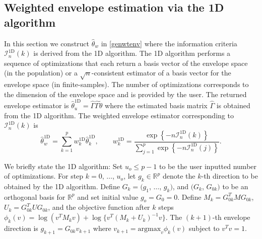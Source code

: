\documentclass{article}\usepackage[]{graphicx}\usepackage[]{color}
\newcommand{\R}{\mathbb{R}}
\newcommand{\TD}{\widehat{\theta}^{\text{1D}}}
\newcommand{\Ttil}{\widetilde{\theta}}
\newcommand{\rootn}{\sqrt{n}}
\newcommand{\EnvwoneD}{\widehat{\theta}^{\text{1D}}_w}
\newcommand{\IoneD}{\mathcal{I}_n^{\text{1D}}}
\newcommand{\woneD}{w^{\text{1D}}}
\begin{document}
\subsection{Weighted envelope estimation via the 1D algorithm}
\label{section:1D}

In this section we construct $\hat{\theta}_w$ in \eqref{genwtenv} where the information criteria $\IoneD(k)$ is derived from the 1D algorithm. The 1D algorithm performs a sequence of optimizations that each return a basis vector of the envelope space (in the population) or a $\rootn$-consistent estimator of a basis vector for the envelope space (in finite-samples). The number of optimizations corresponds to the dimension of the envelope space and is provided by the user. The returned envelope estimator is $\TD_u = \widehat{\Gamma}\widehat{\Gamma}\Ttil$ where the estimated basis matrix $\widehat{\Gamma}$ is obtained from the 1D algorithm. The weighted envelope estimator corresponding to $\IoneD(k)$ is 
\begin{equation} \label{env1D}
  \EnvwoneD = \sum_{k=1}^p \woneD_k\TD_k, 
    \qquad \woneD_k = \frac
  {
    \exp\left\{-n\IoneD(k)\right\}
  }
  {
    \sum_{j=1}^p\exp\left\{-n\IoneD(j)\right\}
  }.
\end{equation}

We briefly state the 1D algorithm: Set $u_o \leq p-1$ to be the user inputted number of optimizations. For step $k = 0$, $\ldots$, $u_o$, let $g_k \in \R^p$ denote the $k$-th direction to be obtained by the 1D algorithm. Define $G_k = (g_1$, $\ldots$, $g_k)$, and $(G_k$, $G_{0k})$ to be an orthogonal basis for $\R^p$ and set initial value $g_o = G_{0} = 0$. Define $M_k = G_{0k}^TMG_{0k}$, $U_k = G_{0k}^TU G_{0k}$, and the objective function after $k$ steps 
$
  \phi_k(v) = \log(v^T M_k v) + \log\{v^T(M_k + U_k)^{-1} v\}.
$
The $(k+1)$-th envelope direction is $g_{k+1} = G_{0k}v_{k+1}$ where $v_{k+1} = \text{argmax}_{v}\phi_k(v)$ subject to $v^Tv = 1$. 
\end{document}
